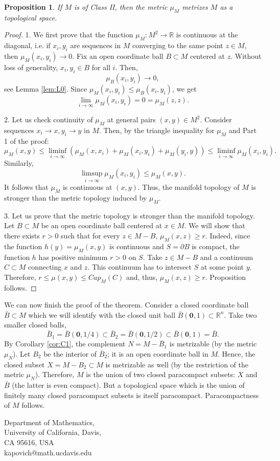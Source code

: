 \documentclass[11pt]{article}   	%
\newtheorem{prop}[thm]{Proposition}
\def\R{\mathbb R}
\begin{document}
\begin{prop}
If $M$ is of Class II, then the metric $\mu_M$ metrizes $M$ as a topological space. 
\end{prop}
\begin{proof} 1. We first prove that the function $\mu_M: M^2\to \R$ is continuous at the diagonal, i.e. if $x_i, y_i$ are sequences in $M$ converging to the same point 
$z\in M$, then $\mu_M(x_i, y_i)\to 0$. Fix an open coordinate  ball $B\subset M$ centered at $z$. Without loss of generality, 
$x_i, y_i\in B$ for all $i$. Then,  
$$
\mu_B(x_i,y_i)\to 0,
$$
see Lemma \ref{lem:L0}. Since $\mu_M(x_i,y_i)\le \mu_B(x_i,y_i)$, we get 
$$
\lim_{i\to\infty} \mu_M(x_i,y_i)= 0= \mu_M(z,z). 
$$ 

2. Let us check continuity of $\mu_M$ at general pairs $(x,y)\in M^2$. Consider sequences $x_i\to x, y_i\to y$ in $M$. 
Then, by the triangle inequality for $\mu_M$ and Part 1 of the proof:
$$
\mu_M(x,y)\le \liminf_{i\to\infty} (\mu_M(x, x_i) + \mu_M(x_i, y_i) + \mu_M(y_i,y))\le   \liminf_{i\to\infty}  \mu_M(x_i, y_i). 
$$ 
Similarly, 
$$
\limsup_{i\to\infty} \mu_M(x_i, y_i)\le \mu_M(x,y). 
$$
It follows that $\mu_M$ is continuous at $(x,y)$. Thus, the manifold topology of $M$ is stronger than the metric topology induced by $\mu_M$. 

3. Let us prove that the metric topology is stronger than the manifold topology. 
Let $B\subset M$ be an open coordinate ball centered at $x\in M$. We will show that there exists $r>0$ such that for every $z\in M- {B}$, $\mu_M(x,z)\ge r$. 
Indeed, since the function $h(y)=\mu_M(x,y)$ is continuous and $S=\partial B$ is compact, the function $h$ has positive minimum $r>0$  on $S$. Take $z\in M- B$ 
and a continuum $C\subset M$ connecting $x$ and $z$. This continuum has to intersect $S$ at some point $y$. Therefore, $r\le \mu(x,y)\le Cap_M(C)$ and, thus,  
$\mu_M(x,z)\ge r$. Proposition follows. 
\end{proof}



We can now finish the proof of the theorem. Consider a closed coordinate ball $\bar{B}\subset M$ which we will identify with the 
closed unit ball $\bar{B}(\mathbf 0, 1)\subset \R^n$. Take two smaller closed  balls, 
$$
\bar{B}_1=\bar{B}(\mathbf 0, 1/4)\subset  \bar{B}_2=\bar{B}(\mathbf 0, 1/2)\subset \bar{B}(\mathbf 0, 1)=\bar{B}.$$
By Corollary \ref{cor:C1}, the complement $N= M - \bar{B}_1$  is metrizable 
(by the metric $\mu_N$). Let $B_2$ be the interior of $\bar{B}_2$; it is an open coordinate ball in $M$.  
Hence, the closed subset $X=M- {B}_2\subset M$ is metrizable as well (by the restriction of 
the metric $\mu_N$). Therefore, $M$ is the union of two closed paracompact subsets: $X$ and $\bar{B}$ (the latter is even compact). 
But a topological space which is the union of finitely many closed paracompact subsets is itself paracompact. 
Paracompactness of $M$ follows.  







\noindent
Department of Mathematics, \\
University of California, Davis,\\ 
 CA 95616, USA \\
 kapovich@math.ucdavis.edu
\end{document}
